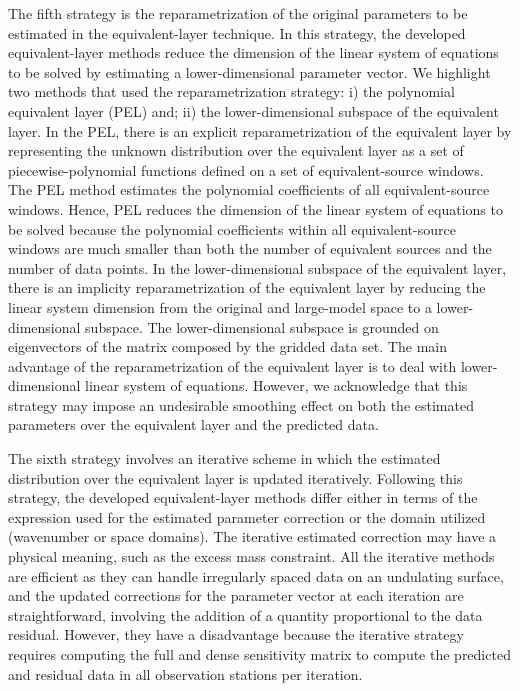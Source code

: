 The fifth strategy is the reparametrization of the original parameters to be estimated in the equivalent-layer technique.
In this strategy, the developed equivalent-layer methods reduce 
the dimension of the linear system of equations to be solved by 
estimating a lower-dimensional parameter vector.
We highlight two methods that used the reparametrization strategy:
i) the polynomial equivalent layer (PEL) and; 
ii) the lower-dimensional subspace of the equivalent layer.
In the PEL, there  is an explicit reparametrization of the equivalent layer
by representing the unknown distribution over the equivalent layer as a set of 
piecewise-polynomial functions defined on a set of equivalent-source windows.
The PEL method estimates the polynomial coefficients of all equivalent-source windows.
Hence, PEL reduces the dimension of the linear system of equations to be solved because the polynomial coefficients within all equivalent-source windows 
are much smaller than both the number of equivalent sources and the number of data points.
In the lower-dimensional subspace of the equivalent layer, there  is an implicity  reparametrization of the equivalent layer by reducing the linear system dimension from the original and large-model space 
to a lower-dimensional subspace.
The lower-dimensional subspace is grounded on eigenvectors of the matrix composed by the gridded data set.
The main advantage of the reparametrization of the equivalent layer is to deal with lower-dimensional  linear system of equations.
However, we acknowledge that this strategy may impose an undesirable smoothing effect on both the estimated parameters over the equivalent layer and the predicted data.


The sixth strategy involves an iterative scheme in which the estimated  distribution over the equivalent layer is updated iteratively. 
Following this strategy, the developed equivalent-layer methods differ 
either in terms of the expression used for the estimated parameter correction 
or the domain utilized (wavenumber or space domains). 
The iterative estimated correction may have a physical meaning, such as the excess mass constraint. 
All the iterative methods are efficient as they can handle irregularly spaced data on an undulating surface, and the updated corrections for the parameter vector at each iteration are straightforward, involving the addition of a quantity proportional to the data residual.
However, they have a disadvantage because the iterative strategy requires computing the full and dense sensitivity matrix to compute 
the predicted and residual data in all observation stations per iteration.


